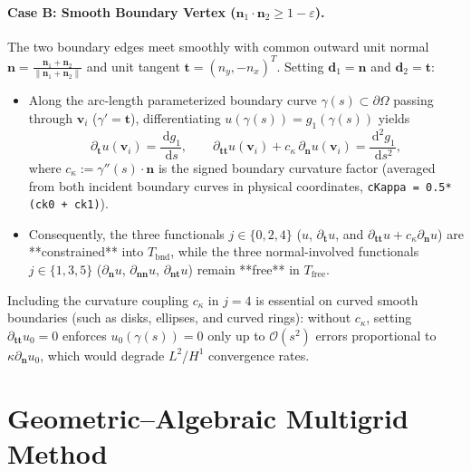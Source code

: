 \documentclass[11pt,a4paper]{article}
\newcommand{\dd}{\,\mathrm{d}}
\newcommand{\bn}{\mathbf{n}}
\newcommand{\bt}{\mathbf{t}}
\newcommand{\bv}{\mathbf{v}}
\begin{document}
\paragraph{Case B: Smooth Boundary Vertex ($\bn_1 \cdot \bn_2 \ge 1 - \varepsilon$).}
The two boundary edges meet smoothly with common outward unit normal $\bn = \frac{\bn_1 + \bn_2}{\|\bn_1 + \bn_2\|}$ and unit tangent $\bt = (n_y, -n_x)^T$. Setting $\mathbf{d}_1 = \bn$ and $\mathbf{d}_2 = \bt$:
\begin{itemize}
    \item Along the arc-length parameterized boundary curve $\gamma(s) \subset \partial\Omega$ passing through $\bv_i$ ($\gamma' = \bt$), differentiating $u(\gamma(s)) = g_1(\gamma(s))$ yields
    \begin{equation}
    \partial_{\bt} u(\bv_i) = \frac{\dd g_1}{\dd s}, \qquad
    \partial_{\bt\bt} u(\bv_i) + c_\kappa \, \partial_{\bn} u(\bv_i) = \frac{\dd^2 g_1}{\dd s^2},
    \end{equation}
    where $c_\kappa := \gamma''(s) \cdot \bn$ is the signed boundary curvature factor (averaged from both incident boundary curves in physical coordinates, \texttt{cKappa = 0.5*(ck0 + ck1)}).
    \item Consequently, the three functionals $j \in \{0, 2, 4\}$ ($u$, $\partial_{\bt} u$, and $\partial_{\bt\bt} u + c_\kappa \partial_{\bn} u$) are **constrained** into $T_{\mathrm{bnd}}$, while the three normal-involved functionals $j \in \{1, 3, 5\}$ ($\partial_{\bn} u$, $\partial_{\bn\bn} u$, $\partial_{\bn\bt} u$) remain **free** in $T_{\mathrm{free}}$.
\end{itemize}
Including the curvature coupling $c_\kappa$ in $j=4$ is essential on curved smooth boundaries (such as disks, ellipses, and curved rings): without $c_\kappa$, setting $\partial_{\bt\bt} u_0 = 0$ enforces $u_0(\gamma(s)) = 0$ only up to $\mathcal{O}(s^2)$ errors proportional to $\kappa \partial_{\bn} u_0$, which would degrade $L^2$/$H^1$ convergence rates.

\section{Geometric--Algebraic Multigrid Method}
\end{document}
